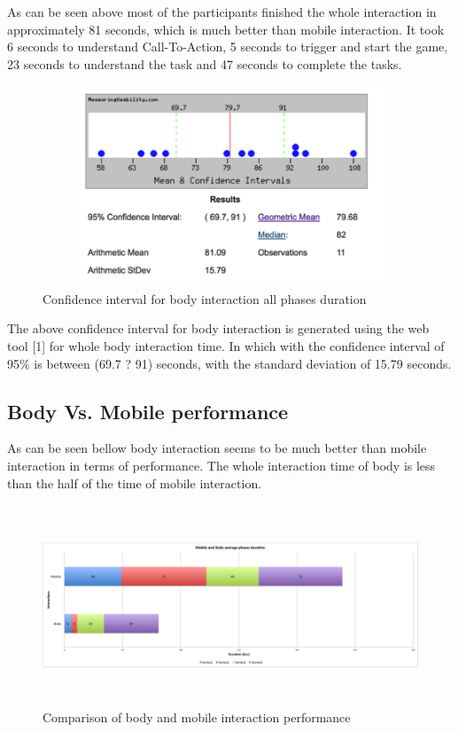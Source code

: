 As can be seen above most of the participants finished the whole interaction in approximately 81 seconds, which is much better than mobile interaction. It took 6 seconds to understand Call-To-Action, 5 seconds to trigger and start the game, 23 seconds to understand the task and 47 seconds to complete the tasks.

\begin{figure}[H]
\centering
\includegraphics[width=12cm,height=6cm]{Figures/6/body_mean}%
 \caption{Confidence interval for body interaction all phases duration }%
 \label{fig:body_mean}%
\end{figure}

The above confidence interval for body interaction is generated using the web tool [1] for whole body interaction time. In which with the confidence interval of 95\% is between (69.7 ? 91) seconds, with the standard deviation of 15.79 seconds.


\subsection{Body Vs. Mobile performance}
As can be seen bellow body interaction seems to be much better than mobile interaction in terms of performance. The whole interaction time of body is less than the half of the time of mobile interaction. 

\begin{figure}[H]
\centering
\includegraphics[width=12cm,height=6cm]{Figures/6/mobile_body_performance}%
 \caption{Comparison of body and mobile interaction performance }%
 \label{fig:mobile_body_performance}%
\end{figure}

